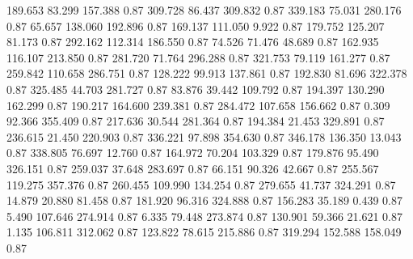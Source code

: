 189.653   83.299  157.388         0.87
 309.728   86.437  309.832         0.87
 339.183   75.031  280.176         0.87
  65.657  138.060  192.896         0.87
 169.137  111.050    9.922         0.87
 179.752  125.207   81.173         0.87
 292.162  112.314  186.550         0.87
  74.526   71.476   48.689         0.87
 162.935  116.107  213.850         0.87
 281.720   71.764  296.288         0.87
 321.753   79.119  161.277         0.87
 259.842  110.658  286.751         0.87
 128.222   99.913  137.861         0.87
 192.830   81.696  322.378         0.87
 325.485   44.703  281.727         0.87
  83.876   39.442  109.792         0.87
 194.397  130.290  162.299         0.87
 190.217  164.600  239.381         0.87
 284.472  107.658  156.662         0.87
   0.309   92.366  355.409         0.87
 217.636   30.544  281.364         0.87
 194.384   21.453  329.891         0.87
 236.615   21.450  220.903         0.87
 336.221   97.898  354.630         0.87
 346.178  136.350   13.043         0.87
 338.805   76.697   12.760         0.87
 164.972   70.204  103.329         0.87
 179.876   95.490  326.151         0.87
 259.037   37.648  283.697         0.87
  66.151   90.326   42.667         0.87
 255.567  119.275  357.376         0.87
 260.455  109.990  134.254         0.87
 279.655   41.737  324.291         0.87
  14.879   20.880   81.458         0.87
 181.920   96.316  324.888         0.87
 156.283   35.189    0.439         0.87
   5.490  107.646  274.914         0.87
   6.335   79.448  273.874         0.87
 130.901   59.366   21.621         0.87
   1.135  106.811  312.062         0.87
 123.822   78.615  215.886         0.87
 319.294  152.588  158.049         0.87
